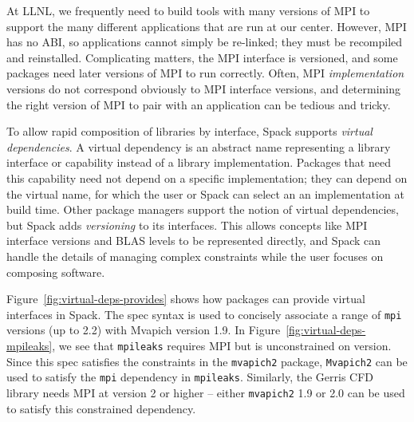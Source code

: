 At LLNL, we frequently need to build tools with many versions of MPI to support
the many different applications that are run at our center.
However, MPI has no ABI, so applications cannot simply be re-linked;
they must be recompiled and reinstalled. 
Complicating matters, the MPI interface is versioned, and some
packages need later versions of MPI to run correctly.  Often, MPI
{\it implementation} versions do not correspond obviously to MPI
interface versions, and determining the right version of 
MPI to pair with an application can be tedious and tricky.

To allow rapid composition of libraries by interface, Spack supports
{\it virtual dependencies}.  A virtual dependency is an abstract name
representing a library interface or capability instead of a library 
implementation.  Packages that need this capability need not depend on 
a specific implementation; they can depend on the virtual name, for which
the user or Spack can select an an implementation at build time.
Other package managers support the notion of virtual dependencies, but Spack
adds {\it versioning} to its interfaces.  This allows concepts like MPI
interface versions and BLAS levels to be represented directly, and Spack can
handle the details of managing complex constraints while the user focuses on 
composing software.

Figure~\ref{fig:virtual-deps-provides} shows how packages can provide
virtual interfaces in Spack.  The spec syntax is used to concisely
associate a range of {\tt mpi} versions (up to 2.2) with Mvapich version 1.9.
In Figure~\ref{fig:virtual-deps-mpileaks}, we see that {\tt mpileaks} requires
MPI but is unconstrained on version.  Since this spec satisfies the constraints in 
the {\tt mvapich2} package, {\tt Mvapich2} can be used to satisfy the {\tt mpi}
dependency in {\tt mpileaks}.  Similarly, the Gerris CFD library needs MPI
at version 2 or higher -- either {\tt mvapich2} 1.9 or 2.0 can be used to satisfy
this constrained dependency.



